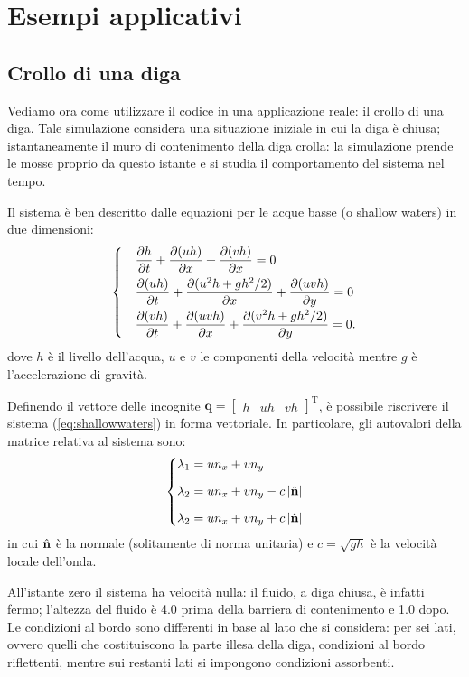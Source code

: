 \section{Esempi applicativi}
\subsection{Crollo di una diga}
Vediamo ora come utilizzare il codice in una applicazione reale: il crollo di una diga. Tale simulazione considera una situazione iniziale in cui la diga è chiusa; istantaneamente il muro di contenimento della diga crolla: la simulazione prende le mosse proprio da questo istante e si studia il comportamento del sistema nel tempo.

Il sistema è ben descritto dalle equazioni per le acque basse (o shallow waters) in due dimensioni:
\begin{equation} \label{eq:shallowwaters}
\begin{cases}
&\dfrac{\partial h}{\partial t} + \dfrac{\partial (uh)}{\partial x} + \dfrac{\partial (vh)}{\partial x} = 0\\[1.5ex]
&\dfrac{\partial (uh)}{\partial t} + \dfrac{\partial (u^2 h + gh^2/2)}{\partial x} + \dfrac{\partial (uvh)}{\partial y} = 0\\[1.5ex]
&\dfrac{\partial (vh)}{\partial t} + \dfrac{\partial (uvh)}{\partial x} + \dfrac{\partial (v^2 h +gh^2/2)}{\partial y} = 0.
\end{cases}
\end{equation}
dove $h$ è il livello dell'acqua, $u$ e $v$ le componenti della velocità mentre $g$ è l'accelerazione di gravità.  

Definendo il vettore delle incognite $\textbf{q} = \left[ \begin{matrix} h & uh & vh \end{matrix} \right]^{\text{T}}$, è possibile riscrivere il sistema (\ref{eq:shallowwaters}) in forma vettoriale. In particolare, gli autovalori della matrice relativa al sistema sono:
\begin{equation*}
\left\{ \begin{aligned}
\lambda_{1} &= u n_x + v n_y \\[1.5ex]
\lambda_{2} &= u n_x + v n_y - c \left| \hat{\mathbf{n}} \right|\\[1.5ex]
\lambda_{2} &= u n_x + v n_y + c \left| \hat{\mathbf{n}} \right|
\end{aligned}  \right.
\end{equation*}
in cui $\hat{\mathbf{n}}$ è la normale (solitamente di norma unitaria) e $c = \sqrt{gh}$ è la velocità locale dell'onda.

All'istante zero il sistema ha velocità nulla: il fluido, a diga chiusa, è infatti fermo; l'altezza del fluido è 4.0 prima della barriera di contenimento e 1.0 dopo. Le condizioni al bordo sono differenti in base al lato che si considera: per sei lati, ovvero quelli che costituiscono la parte illesa della diga, condizioni al bordo riflettenti, mentre sui restanti lati si impongono condizioni assorbenti.

